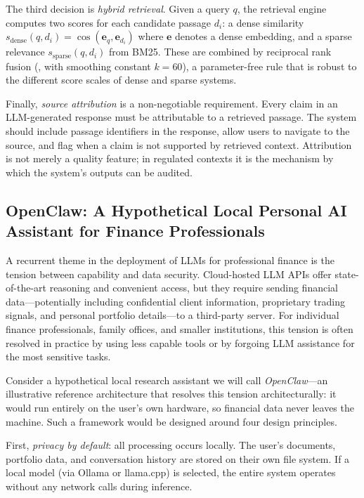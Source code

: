 \begin{context}
The third decision is \emph{hybrid retrieval}. Given a query $q$, the retrieval engine computes two scores for each candidate passage $d_i$: a dense similarity $s_{\text{dense}}(q, d_i) = \cos(\mathbf{e}_q, \mathbf{e}_{d_i})$ where $\mathbf{e}$ denotes a dense embedding, and a sparse relevance $s_{\text{sparse}}(q, d_i)$ from BM25. These are combined by reciprocal rank fusion (, with smoothing constant $k = 60$), a parameter-free rule that is robust to the different score scales of dense and sparse systems.

Finally, \emph{source attribution} is a non-negotiable requirement. Every claim in an LLM-generated response must be attributable to a retrieved passage. The system should include passage identifiers in the response, allow users to navigate to the source, and flag when a claim is not supported by retrieved context. Attribution is not merely a quality feature; in regulated contexts it is the mechanism by which the system's outputs can be audited.

\subsection{OpenClaw: A Hypothetical Local Personal AI Assistant for Finance Professionals}
\label{subsec:af-ra-openclaw}

A recurrent theme in the deployment of LLMs for professional finance is the tension between capability and data security. Cloud-hosted LLM APIs offer state-of-the-art reasoning and convenient access, but they require sending financial data---potentially including confidential client information, proprietary trading signals, and personal portfolio details---to a third-party server. For individual finance professionals, family offices, and smaller institutions, this tension is often resolved in practice by using less capable tools or by forgoing LLM assistance for the most sensitive tasks.

Consider a hypothetical local research assistant we will call \emph{OpenClaw}---an illustrative reference architecture that resolves this tension architecturally: it would run entirely on the user's own hardware, so financial data never leaves the machine. Such a framework would be designed around four design principles.

First, \emph{privacy by default}: all processing occurs locally. The user's documents, portfolio data, and conversation history are stored on their own file system. If a local model (via Ollama or llama.cpp) is selected, the entire system operates without any network calls during inference.


\end{context}
